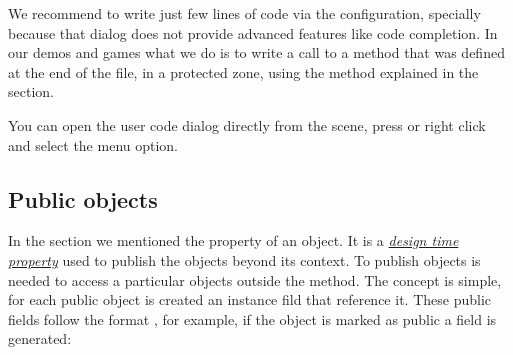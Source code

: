 \documentclass[letterpaper,10pt,english]{sphinxmanual}
\begin{document}
We recommend to write just few lines of code via the  configuration, specially because that dialog does not provide advanced features like code completion. In our demos and games what we do is to write a call to a method that was defined at the end of the file, in a protected zone, using the method explained in the {\hyperref[\detokenize{canvas:writting-into-the-code-file}]{}} section.

You can open the user code dialog directly from the scene, press  or right click and select the  menu option.


\subsection{Public objects}
\label{\detokenize{canvas:public-objects}}
In the {\hyperref[\detokenize{canvas:object-properties}]{}} section we mentioned the  property of an object. It is a {\hyperref[\detokenize{canvas:design-time-object-properties}]{\emph{design time property}}} used to publish the objects beyond its context. To publish objects is needed to access a particular objects outside the  method. The concept is simple, for each public object is created an instance fild that reference it. These public fields follow the format , for example, if the object  is marked as public a field  is generated:

\begin{sphinxVerbatim}[commandchars=\\\{\}]
   
              


          



   
          
\end{sphinxVerbatim}
\end{document}
